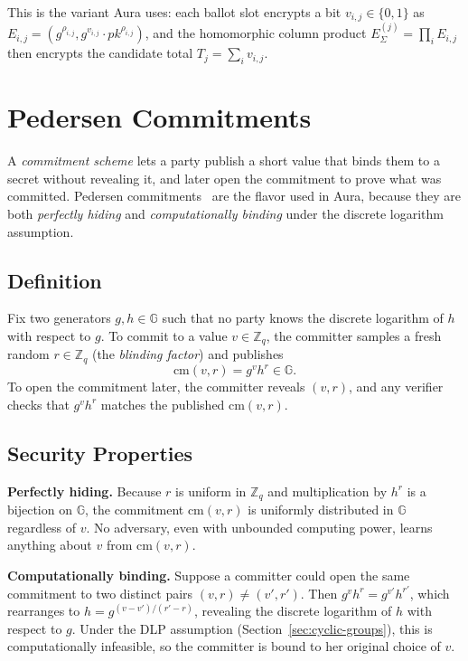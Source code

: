 \documentclass[12pt,a4paper,oneside]{report}
\begin{document}
This is the variant Aura uses: each ballot slot encrypts a bit $v_{i,j} \in \{0, 1\}$ 
as $E_{i,j} = (g^{\rho_{i,j}}, g^{v_{i,j}} \cdot pk^{\rho_{i,j}})$, and the 
homomorphic column product $E_\Sigma^{(j)} = \prod_i E_{i,j}$ then encrypts 
the candidate total $T_j = \sum_i v_{i,j}$.
\section{Pedersen Commitments}
\label{sec:pedersen}

A \textit{commitment scheme} lets a party publish a short value that 
binds them to a secret without revealing it, and later open the commitment 
to prove what was committed. Pedersen commitments~\cite{pedersen} are the 
flavor used in Aura, because they are both \textit{perfectly hiding} and 
\textit{computationally binding} under the discrete logarithm assumption.

\subsection*{Definition}
Fix two generators $g, h \in \mathbb{G}$ such that no party knows the 
discrete logarithm of $h$ with respect to $g$. To commit to a value 
$v \in \mathbb{Z}_q$, the committer samples a fresh random 
$r \in \mathbb{Z}_q$ (the \textit{blinding factor}) and publishes
\[
    \text{cm}(v, r) = g^v h^r \in \mathbb{G}.
\]
To open the commitment later, the committer reveals $(v, r)$, and any 
verifier checks that $g^v h^r$ matches the published $\text{cm}(v, r)$.

\subsection*{Security Properties}
\textbf{Perfectly hiding.} Because $r$ is uniform in $\mathbb{Z}_q$ and 
multiplication by $h^r$ is a bijection on $\mathbb{G}$, the commitment 
$\text{cm}(v, r)$ is uniformly distributed in $\mathbb{G}$ regardless of $v$. 
No adversary, even with unbounded computing power, learns anything about 
$v$ from $\text{cm}(v, r)$.

\textbf{Computationally binding.} Suppose a committer could open the same 
commitment to two distinct pairs $(v, r) \ne (v', r')$. Then 
$g^v h^r = g^{v'} h^{r'}$, which rearranges to $h = g^{(v - v') / (r' - r)}$, 
revealing the discrete logarithm of $h$ with respect to $g$. Under the DLP 
assumption (Section~\ref{sec:cyclic-groups}), this is computationally 
infeasible, so the committer is bound to her original choice of $v$.
\end{document}
